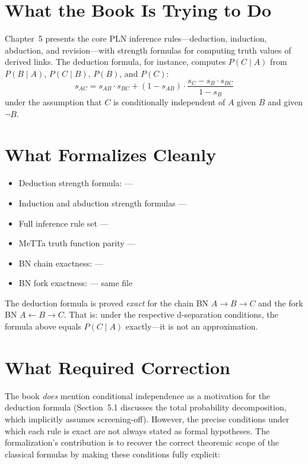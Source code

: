 \documentclass[11pt,openany]{report}
\begin{document}
\section{What the Book Is Trying to Do}

Chapter~5 presents the core PLN inference rules---deduction, induction,
abduction, and revision---with strength formulas for computing truth values
of derived links.  The deduction formula, for instance, computes
$P(C \mid A)$ from $P(B \mid A)$, $P(C \mid B)$, $P(B)$, and $P(C)$:
\[
  s_{AC} = s_{AB} \cdot s_{BC} + (1 - s_{AB}) \cdot
  \frac{s_C - s_B \cdot s_{BC}}{1 - s_B}
\]
under the assumption that $C$ is conditionally independent of $A$
given $B$ and given $\lnot B$.

\section{What Formalizes Cleanly}

\begin{itemize}
\item Deduction strength formula:  ---
\item Induction and abduction strength formulas ---
\item Full inference rule set ---
\item MeTTa truth function parity ---
\item BN chain exactness:  ---
\item BN fork exactness:  ---
  same file
\end{itemize}

The deduction formula is proved \emph{exact} for the chain BN
$A \to B \to C$ and the fork BN $A \leftarrow B \to C$.  That is:
under the respective d-separation conditions, the formula above equals
$P(C \mid A)$ exactly---it is not an approximation.

\section{What Required Correction}

The book \emph{does} mention conditional independence as a motivation
for the deduction formula (Section~5.1 discusses the total probability
decomposition, which implicitly assumes screening-off).  However, the
precise conditions under which each rule is exact are not always stated
as formal hypotheses.  The formalization's contribution is to recover
the correct theoremic scope of the classical formulas by making these
conditions fully explicit:
\end{document}

